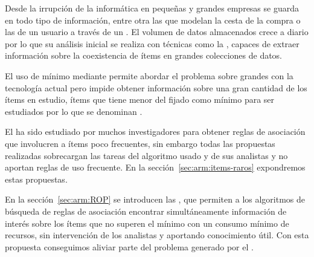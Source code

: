 Desde la irrupción de la informática en pequeñas y grandes empresas se guarda en \dbs todo tipo de información, entre otra las \transacciones que modelan la cesta de la compra o las \sns de un usuario a través de un \portalWeb. El volumen de datos almacenados crece a diario por lo que su análisis inicial se realiza con técnicas como la \arm, capaces de extraer información sobre la coexistencia de ítems en grandes colecciones de datos.

El uso de \soporte mínimo mediante \arm permite abordar el problema sobre grandes \dbs con la tecnología actual pero impide obtener información sobre una gran cantidad de los ítems en estudio, ítems que tiene menor \soporte del fijado como mínimo para ser estudiados por lo que se denominan \irs.

El \dilemaIR ha sido estudiado por muchos investigadores para obtener reglas de asociación que involucren a ítems poco frecuentes, sin embargo todas las propuestas realizadas sobrecargan las tareas del algoritmo usado y de sus analistas y no aportan reglas de uso frecuente. En la sección~\ref{sec:arm:items-raros} expondremos estas propuestas.

En la sección~\ref{sec:arm:ROP} se introducen las \ROPs, que permiten a los algoritmos de búsqueda de reglas de asociación encontrar simultáneamente información de interés sobre los ítems que no superen el \soporte mínimo con un consumo mínimo de recursos, sin intervención de los analistas y aportando conocimiento útil. Con esta propuesta conseguimos aliviar parte del problema generado por el \dilemaIR.
